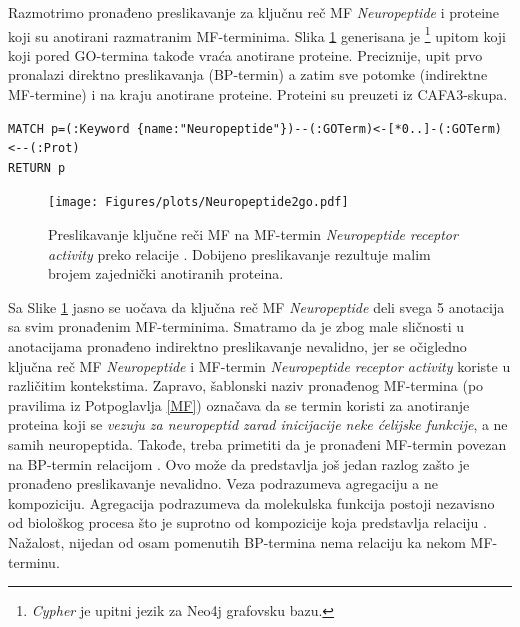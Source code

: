 Razmotrimo pronađeno preslikavanje za ključnu reč MF \textit{Neuropeptide} i
proteine koji su anotirani razmatranim MF-terminima. Slika \ref{fig:neuropeptide}
generisana je \footnote{\textit{Cypher} je upitni jezik za
Neo4j grafovsku bazu.} upitom koji koji pored GO-termina takođe vraća anotirane
proteine. Preciznije, upit prvo pronalazi direktno preslikavanja (BP-termin)  a
zatim sve potomke (indirektne MF-termine) i na kraju anotirane proteine.
Proteini su preuzeti iz CAFA3-skupa. 

{ \fontsize{9}{9} 
\begin{verbatim}
MATCH p=(:Keyword {name:"Neuropeptide"})--(:GOTerm)<-[*0..]-(:GOTerm)<--(:Prot)
RETURN p
\end{verbatim}
}

\begin{figure}[!th]
\centering
\texttt{[image: Figures/plots/Neuropeptide2go.pdf]}
\caption {
  Preslikavanje ključne reči MF  na MF-termin
  \textit{Neuropeptide receptor activity} preko relacije .
  Dobijeno preslikavanje rezultuje malim brojem zajednički anotiranih proteina.
}
\label{fig:neuropeptide}
\end{figure}

Sa Slike \ref{fig:neuropeptide} jasno se uočava da ključna reč MF
\textit{Neuropeptide} deli svega 5 anotacija sa svim pronađenim MF-terminima.
Smatramo da je zbog male sličnosti u anotacijama pronađeno indirektno
preslikavanje nevalidno, jer se očigledno ključna reč MF \textit{Neuropeptide} i
MF-termin \textit{Neuropeptide receptor activity} koriste u različitim
kontekstima. Zapravo, šablonski naziv pronađenog MF-termina (po pravilima iz
Potpoglavlja \ref{MF}) označava da se termin koristi za anotiranje proteina
koji se \textit{vezuju za neuropeptid zarad inicijacije neke ćelijske
funkcije}, a ne samih neuropeptida. Takođe, treba primetiti da je pronađeni MF-termin povezan na BP-termin relacijom .  Ovo može da
predstavlja još jedan razlog zašto je pronađeno preslikavanje nevalidno.  Veza
 podrazumeva agregaciju a ne kompoziciju. Agregacija
podrazumeva da  molekulska funkcija postoji nezavisno od biološkog procesa što
je suprotno od kompozicije koja predstavlja relaciju . Nažalost,
nijedan od osam pomenutih BP-termina nema relaciju  ka nekom MF-terminu.

\clearpage


